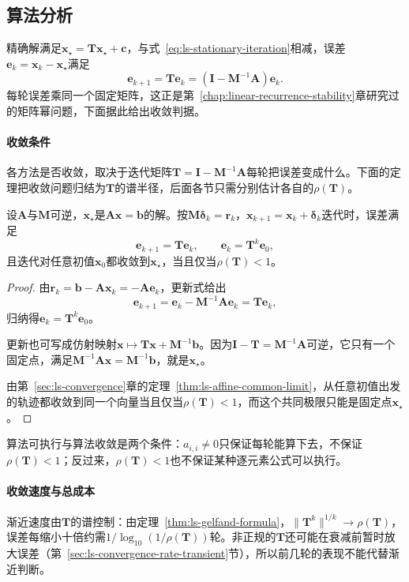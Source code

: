 \subsection{算法分析}

精确解满足$\bm x_\star=\bm T\bm x_\star+\bm c$，与式~\eqref{eq:ls-stationary-iteration}相减，误差$\bm e_k=\bm x_k-\bm x_\star$满足
\[
 \bm e_{k+1}=\bm T\bm e_k=(\bm I-\bm M^{-1}\bm A)\bm e_k .
\]
每轮误差乘同一个固定矩阵，这正是第~\ref{chap:linear-recurrence-stability}章研究过的矩阵幂问题，下面据此给出收敛判据。

\paragraph{收敛条件}
各方法是否收敛，取决于迭代矩阵$\bm T=\bm I-\bm M^{-1}\bm A$每轮把误差变成什么。下面的定理把收敛问题归结为$\bm T$的谱半径，后面各节只需分别估计各自的$\rho(\bm T)$。
\begin{theorem}[定常迭代的收敛判据]
\label{thm:ls-stationary-convergence}
设$\bm A$与$\bm M$可逆，$\bm x_\star$是$\bm A\bm x=\bm b$的解。按$\bm M\bm\delta_k=\bm r_k$，$\bm x_{k+1}=\bm x_k+\bm\delta_k$迭代时，误差满足
\begin{equation}
\bm e_{k+1}=\bm T\bm e_k,\qquad \bm e_k=\bm T^k\bm e_0 ,
 \label{eq:ls-stationary-error-recursion}
\end{equation}
且迭代对任意初值$\bm x_0$都收敛到$\bm x_\star$，当且仅当$\rho(\bm T)<1$。
\end{theorem}
\begin{proof}
由$\bm r_k=\bm b-\bm A\bm x_k=-\bm A\bm e_k$，更新式给出
\[
 \bm e_{k+1}=\bm e_k-\bm M^{-1}\bm A\bm e_k=\bm T\bm e_k ,
\]
归纳得$\bm e_k=\bm T^k\bm e_0$。

更新也可写成仿射映射$\bm x\mapsto\bm T\bm x+\bm M^{-1}\bm b$。因为$\bm I-\bm T=\bm M^{-1}\bm A$可逆，它只有一个固定点，满足$\bm M^{-1}\bm A\bm x=\bm M^{-1}\bm b$，就是$\bm x_\star$。

由第~\ref{sec:ls-convergence}章的定理~\ref{thm:ls-affine-common-limit}，从任意初值出发的轨迹都收敛到同一个向量当且仅当$\rho(\bm T)<1$，而这个共同极限只能是固定点$\bm x_\star$。
\end{proof}

算法可执行与算法收敛是两个条件：$a_{i,i}\neq0$只保证每轮能算下去，不保证$\rho(\bm T)<1$；反过来，$\rho(\bm T)<1$也不保证某种逐元素公式可以执行。

\paragraph{收敛速度与总成本}
渐近速度由$\bm T$的谱控制：由定理~\ref{thm:ls-gelfand-formula}，$\lVert\bm T^k\rVert^{1/k}\to\rho(\bm T)$，误差每缩小十倍约需$1/\log_{10}(1/\rho(\bm T))$轮。非正规的$\bm T$还可能在衰减前暂时放大误差（第~\ref{sec:ls-convergence-rate-transient}节），所以前几轮的表现不能代替渐近判断。

